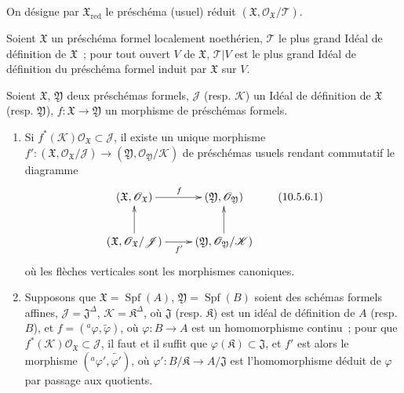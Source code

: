 On désigne par $\mathfrak{X}_{\mathrm{red}}$ le préschéma (usuel) réduit
$(\mathfrak{X},\mathscr{O}_{\mathfrak{X}}/\mathscr{T})$.

\begin{corollary}[10.5.5]
\label{I.10.5.5-fr}
Soient $\mathfrak{X}$ un préschéma formel localement noethérien,
$\mathscr{T}$ le plus grand Idéal de définition de $\mathfrak{X}$~; pour
tout ouvert $V$ de $\mathfrak{X}$, $\mathscr{T}|V$ est le plus grand
Idéal de définition du préschéma formel induit par $\mathfrak{X}$ sur
$V$.
\end{corollary}


\begin{proposition}[10.5.6]
\label{I.10.5.6-fr}
Soient $\mathfrak{X}$, $\mathfrak{Y}$ deux préschémas formels,
$\mathscr{J}$ (resp. $\mathscr{K}$) un Idéal de définition de
$\mathfrak{X}$ (resp. $\mathfrak{Y}$),
$f:\mathfrak{X}\to\mathfrak{Y}$ un morphisme de préschémas formels.
\begin{enumerate}
  \item[\rm{(i)}] Si
    $f^*(\mathscr{K})\mathscr{O}_{\mathfrak{X}}\subset\mathscr{J}$,
    il existe un unique morphisme
    $f':(\mathfrak{X},\mathscr{O}_{\mathfrak{X}}/\mathscr{J})\to
    (\mathfrak{Y},\mathscr{O}_{\mathfrak{Y}}/\mathscr{K})$ de
    préschémas usuels rendant commutatif le diagramme
    \[
      \label{I.10.5.6.1-fr}
      \xymatrix{
        (\mathfrak{X},\mathscr{O}_{\mathfrak{X}})\ar[r]^f &
        (\mathfrak{Y},\mathscr{O}_{\mathfrak{Y}})\\
        (\mathfrak{X},\mathscr{O}_{\mathfrak{X}}/\mathscr{J})
          \ar[r]_{f'}\ar[u] &
        (\mathfrak{Y},\mathscr{O}_{\mathfrak{Y}}/\mathscr{K})\ar[u]
      }
      \tag{10.5.6.1}
    \]
    où les flèches verticales sont les morphismes canoniques.
  \item[\rm{(ii)}] Supposons que
    $\mathfrak{X}=\operatorname{Spf}(A)$,
    $\mathfrak{Y}=\operatorname{Spf}(B)$ soient des schémas formels
    affines, $\mathscr{J}=\mathfrak{J}^{\Delta}$,
    $\mathscr{K}=\mathfrak{K}^{\Delta}$, où $\mathfrak{J}$ (resp.
    $\mathfrak{K}$) est un idéal de définition de $A$ (resp. $B$), et
    $f=({}^a\varphi,\widetilde{\varphi})$, où
    $\varphi:B\to A$ est un homomorphisme continu~; pour que
    $f^*(\mathscr{K})\mathscr{O}_{\mathfrak{X}}\subset\mathscr{J}$,
    il faut et il suffit que
    $\varphi(\mathfrak{K})\subset\mathfrak{J}$, et $f'$ est alors le
    morphisme $({}^a\varphi',\widetilde{\varphi'})$, où
    $\varphi':B/\mathfrak{K}\to A/\mathfrak{J}$ est l'homomorphisme
    déduit de $\varphi$ par passage aux quotients.
\end{enumerate}
\end{proposition}

